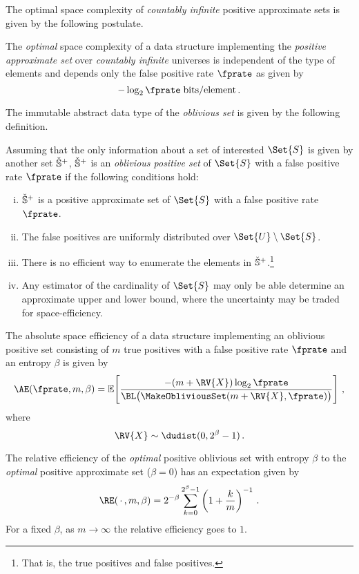 \documentclass[ ../main.tex]{subfiles}
\begin{document}
The optimal space complexity of \emph{countably infinite} positive approximate sets is given by the following postulate.
\begin{postulate}
The \emph{optimal} space complexity of a data structure implementing the \emph{positive approximate set} over \emph{countably infinite} universes is independent of the type of elements and depends only the false positive rate $\fprate$ as given by
\begin{equation}
    -\log_2 \fprate \; \si{bits \per element}\,.
\end{equation}
\end{postulate}

The immutable abstract data type of the \emph{oblivious set}\cite{obset} is given by the following definition.
\begin{definition}
\label{def:obliviousset}
Assuming that the only information about a set of interested $\Set{S}$ is given by another set $\check{\mathbb{S}}^+$, $\check{\mathbb{S}}^+$ is an \emph{oblivious positive set} of $\Set{S}$ with a false positive rate $\fprate$ if the following conditions hold:
\begin{enumerate}[(i)]
    \item $\check{\mathbb{S}}^+$ is a positive approximate set of $\Set{S}$ with a false positive rate $\fprate$.
    \item The false positives are uniformly distributed over $\Set{U} \setminus \Set{S}$.
    \item There is no efficient way to enumerate the elements in $\check{\mathbb{S}}^+$.\footnote{That is, the true positives and false positives.}
    \item Any estimator of the cardinality of $\Set{S}$ may only be able determine an approximate upper and lower bound, where the uncertainty may be traded for space-efficiency.
\end{enumerate}
\end{definition}

The absolute space efficiency of a data structure implementing an oblivious positive set consisting of $m$ true positives with a false positive rate $\fprate$ and an entropy $\beta$ is given by
\begin{equation}
    \AE(\fprate, m, \beta) = \expectation\!\left[\frac{-(m + \RV{X}) \log_2 \fprate}{\BL\!\left(\MakeObliviousSet(m + \RV{X},\fprate)\right)}\right]\,,
\end{equation}
where
\begin{equation}
    \RV{X} \sim \dudist(0,2^\beta - 1)\,.
\end{equation}

The relative efficiency of the \emph{optimal} positive oblivious set with entropy $\beta$ to the \emph{optimal} positive approximate set ($\beta = 0$) has an expectation given by
\begin{equation}
    \RE(\,\cdot\,, m, \beta) = 2^{-\beta} \sum_{k=0}^{2^\beta-1} \left(1 + \frac{k}{m}\right)^{-1}\,.
\end{equation}
For a fixed $\beta$, as $m \to \infty$ the relative efficiency goes to $1$.
\end{document}
